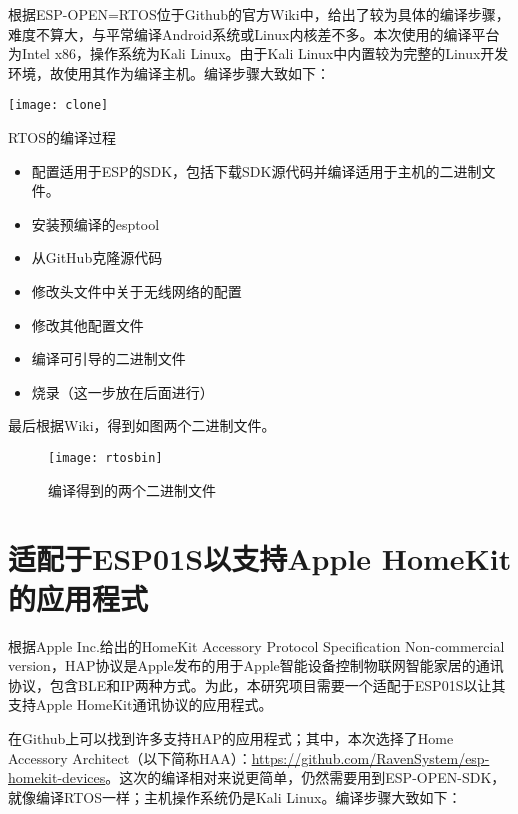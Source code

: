 \setlength\parindent{2em} 根据ESP-OPEN=RTOS位于Github的官方Wiki中，给出了较为具体的编译步骤，难度不算大，与平常编译Android系统或Linux内核差不多。本次使用的编译平台为Intel x86，操作系统为Kali Linux。由于Kali Linux中内置较为完整的Linux开发环境，故使用其作为编译主机。编译步骤大致如下：

\begin{marginfigure}[0cm]
	\texttt{[image: clone]}
	\caption[clone]{RTOS的编译过程}
\end{marginfigure}


\begin{itemize}
	\item 配置适用于ESP的SDK，包括下载SDK源代码并编译适用于主机的二进制文件。
	\item 安装预编译的esptool
	\item 从GitHub克隆源代码
	\item 修改头文件中关于无线网络的配置
	\item 修改其他配置文件
	\item 编译可引导的二进制文件
	\item 烧录（这一步放在后面进行）
\end{itemize}

最后根据Wiki，得到如图两个二进制文件。

\begin{figure*}[h!]
	\texttt{[image: rtosbin]}
	\caption[rtosbin]{编译得到的两个二进制文件}
\end{figure*}

\section{适配于ESP01S以支持Apple HomeKit的应用程式}

\setlength\parindent{2em} 根据Apple Inc.给出的HomeKit Accessory Protocol Specification Non-commercial version，HAP协议是Apple发布的用于Apple智能设备控制物联网智能家居的通讯协议，包含BLE和IP两种方式。为此，本研究项目需要一个适配于ESP01S以让其支持Apple HomeKit通讯协议的应用程式。

\par 在Github上可以找到许多支持HAP的应用程式；其中，本次选择了Home Accessory Architect（以下简称HAA）：\url{https://github.com/RavenSystem/esp-homekit-devices}。这次的编译相对来说更简单，仍然需要用到ESP-OPEN-SDK，就像编译RTOS一样；主机操作系统仍是Kali Linux。编译步骤大致如下：

